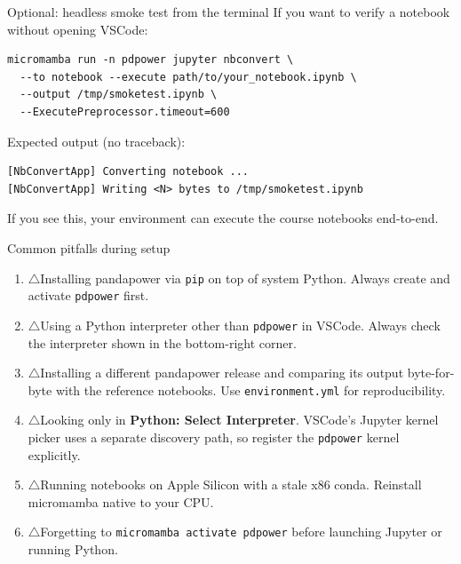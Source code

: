\documentclass[aspectratio=169,10pt]{beamer}
\newcommand{\code}[1]{\texttt{#1}}
\newcommand{\warnitem}{\textcolor{warnorange}{\Large$\triangle$}\;}
\begin{document}
\begin{frame}[fragile]{Optional: headless smoke test from the terminal}
If you want to verify a notebook without opening VSCode:
\begin{lstlisting}
micromamba run -n pdpower jupyter nbconvert \
  --to notebook --execute path/to/your_notebook.ipynb \
  --output /tmp/smoketest.ipynb \
  --ExecutePreprocessor.timeout=600
\end{lstlisting}
\vspace{0.5em}
Expected output (no traceback):
\begin{lstlisting}
[NbConvertApp] Converting notebook ...
[NbConvertApp] Writing <N> bytes to /tmp/smoketest.ipynb
\end{lstlisting}
If you see this, your environment can execute the course notebooks end-to-end.
\end{frame}

\begin{frame}{Common pitfalls during setup}
\begin{enumerate}
  \item \warnitem Installing pandapower via \code{pip} on top of system Python. Always create and activate \code{pdpower} first.
  \item \warnitem Using a Python interpreter other than \code{pdpower} in VSCode. Always check the interpreter shown in the bottom-right corner.
  \item \warnitem Installing a different pandapower release and comparing its output byte-for-byte with the reference notebooks. Use \code{environment.yml} for reproducibility.
  \item \warnitem Looking only in \textbf{Python: Select Interpreter}. VSCode's Jupyter kernel picker uses a separate discovery path, so register the \code{pdpower} kernel explicitly.
  \item \warnitem Running notebooks on Apple Silicon with a stale x86 conda. Reinstall micromamba native to your CPU.
  \item \warnitem Forgetting to \code{micromamba activate pdpower} before launching Jupyter or running Python.
\end{enumerate}
\end{frame}
\end{document}
